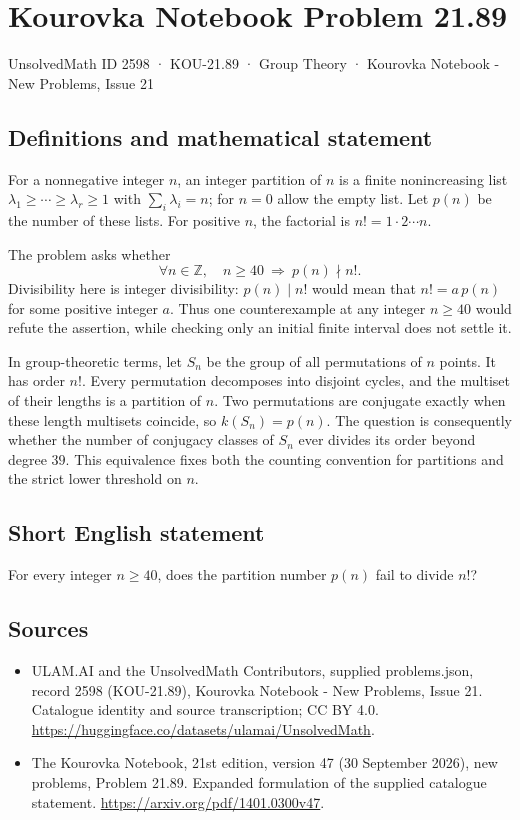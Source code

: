 \documentclass[11pt,a4paper]{article}
\begin{document}
\section*{Kourovka Notebook Problem 21.89}\label{2598}
{\small UnsolvedMath ID 2598 · KOU-21.89 · Group Theory · Kourovka Notebook - New Problems, Issue 21}
\subsection{Definitions and mathematical statement}
For a nonnegative integer $n$, an integer partition of $n$ is a finite nonincreasing list $\lambda_1\ge\cdots\ge\lambda_r\ge1$ with $\sum_i\lambda_i=n$; for $n=0$ allow the empty list. Let $p(n)$ be the number of these lists. For positive $n$, the factorial is $n!=1\cdot2\cdots n$.

The problem asks whether
\[
 \forall n\in\mathbb Z,\quad n\ge40\ \Longrightarrow\ p(n)\nmid n!.
\]
Divisibility here is integer divisibility: $p(n)\mid n!$ would mean that $n!=a\,p(n)$ for some positive integer $a$. Thus one counterexample at any integer $n\ge40$ would refute the assertion, while checking only an initial finite interval does not settle it.

In group-theoretic terms, let $S_n$ be the group of all permutations of $n$ points. It has order $n!$. Every permutation decomposes into disjoint cycles, and the multiset of their lengths is a partition of $n$. Two permutations are conjugate exactly when these length multisets coincide, so $k(S_n)=p(n)$. The question is consequently whether the number of conjugacy classes of $S_n$ ever divides its order beyond degree $39$. This equivalence fixes both the counting convention for partitions and the strict lower threshold on $n$.
\subsection{Short English statement}
For every integer $n\ge40$, does the partition number $p(n)$ fail to divide $n!$?
\subsection{Sources}
\begin{itemize}
\item[S1] ULAM.AI and the UnsolvedMath Contributors, supplied problems.json, record 2598 (KOU-21.89), Kourovka Notebook - New Problems, Issue 21. Catalogue identity and source transcription; CC BY 4.0.
\url{https://huggingface.co/datasets/ulamai/UnsolvedMath}.
\item[S2] The Kourovka Notebook, 21st edition, version 47 (30 September 2026), new problems, Problem 21.89. Expanded formulation of the supplied catalogue statement.
\url{https://arxiv.org/pdf/1401.0300v47}.
\end{itemize}
\end{document}
